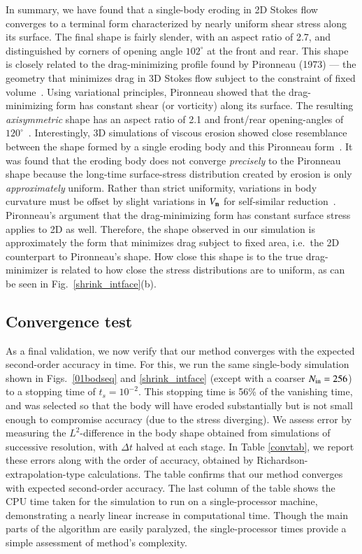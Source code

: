 \documentclass[preprint, 10pt]{elsarticle}
\begin{document}
	In summary, we have found that a single-body eroding in 2D
        Stokes flow converges to a terminal form characterized by nearly
        uniform shear stress along its surface. The final shape is
        fairly slender, with an aspect ratio of 2.7, and distinguished
        by  corners of opening angle $102^{\circ}$ at the front and
        rear. This shape is closely related to the drag-minimizing
        profile found by Pironneau (1973) --- the geometry that
        minimizes drag in 3D Stokes flow subject to the constraint of
        fixed volume~\cite{pir1973}. Using variational principles,
        Pironneau showed that the drag-minimizing form has constant
        shear (or vorticity) along its surface. The resulting {\em
        axisymmetric} shape has an aspect ratio of 2.1 and front/rear
        opening-angles of $120^{\circ}$~\cite{pir1973, mit-spa2016}.
        Interestingly, 3D simulations of viscous erosion showed close
        resemblance between the shape formed by a single eroding body
        and this Pironneau form~\cite{mit-spa2016}. It was found that
        the eroding body does not converge {\em precisely} to the
        Pironneau shape because the long-time surface-stress
        distribution created by erosion is only {\em approximately}
        uniform. Rather than strict uniformity, variations in body
        curvature must be offset by slight variations in $V_{\mathbf{n}}$ for
        self-similar reduction~\cite{pir1973, mit-spa2016}. Pironneau's argument that the drag-minimizing form has constant surface stress applies to 2D as well. Therefore, the shape observed in our simulation is approximately the form that minimizes drag subject to fixed area, i.e.~the 2D counterpart to Pironneau's shape. How close this shape is to the true drag-minimizer is related to how close the stress distributions are to uniform, as can be seen in Fig.~\ref{shrink_intface}(b).

\subsection{Convergence test}

As a final validation, we now verify that our method converges with the expected second-order accuracy in time. For this, we run the same single-body simulation shown in Figs.~\ref{01bodseq} and \ref{shrink_intface} (except with a coarser $N_{\mathrm{in}}=256$) to a stopping time of $t_s = 10^{-2}$. This stopping time is 56\% of the vanishing time, and was selected so that the body will have eroded substantially but is not small enough to compromise accuracy (due to the stress diverging).
We assess error by measuring the $L^2$-difference in the body shape obtained from simulations of successive resolution, with $\Delta t$ halved at each stage. In Table \ref{convtab}, we report these errors along with the order of accuracy, obtained by Richardson-extrapolation-type calculations. The table confirms that our method converges with expected second-order accuracy. The last column of the table shows the CPU time taken for the simulation to run on a single-processor machine, demonstrating a nearly linear increase in computational time. Though the main parts of the algorithm are easily paralyzed, the single-processor times provide a simple assessment of method's complexity.
\end{document}
